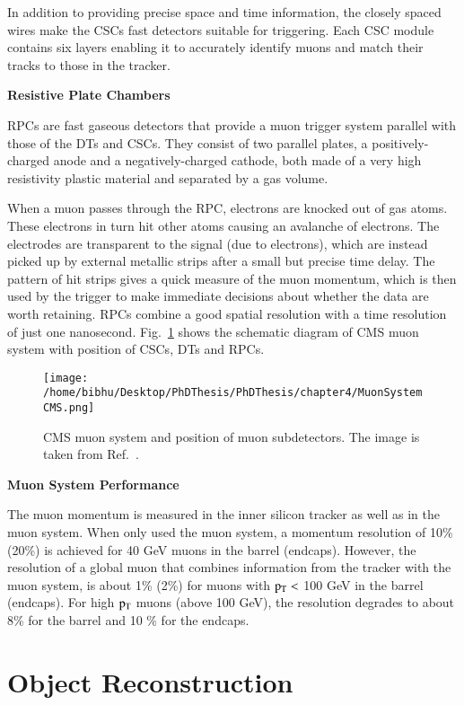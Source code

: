 In addition to providing precise space and time information, the closely spaced wires make the CSCs fast detectors suitable for triggering. Each CSC module contains six layers enabling it to accurately identify muons and match their tracks to those in the tracker. 


{\bf Resistive Plate Chambers}

RPCs are fast gaseous detectors that provide a muon trigger system parallel with those of the DTs and CSCs. They consist of two parallel plates, a positively-charged anode and a negatively-charged cathode, both made of a very high resistivity plastic material and separated by a gas volume.

When a muon passes through the RPC, electrons are knocked out of gas atoms. These electrons in turn hit other atoms causing an avalanche of electrons. The electrodes are transparent to the signal (due to electrons), which are instead picked up by external metallic strips after a small but precise time delay. The pattern of hit strips gives a quick measure of the muon momentum, which is then used by the trigger to make immediate decisions about whether the data are worth retaining. RPCs combine a good spatial resolution with a time resolution of just one nanosecond. Fig.~\ref{fig:MuonSystem} shows the schematic diagram of CMS muon system with position of CSCs, DTs and RPCs.


\begin{figure}[H]
    \centering
    \texttt{[image: /home/bibhu/Desktop/PhDThesis/PhDThesis/chapter4/MuonSystemCMS.png]}
    \caption{ \small CMS muon system and position of muon subdetectors. The image is taken from Ref.~\cite{MuonSysImage}.}
    \label{fig:MuonSystem}
\end{figure}

{\bf Muon System Performance}

The muon momentum is measured in the inner silicon tracker as well as in the muon system. When only used the muon system, a momentum resolution of 10\% (20\%) is achieved for 40 GeV muons in the barrel (endcaps). However, the resolution of a global muon that combines information from the tracker with the muon system, is about 1\% (2\%) for muons with $\rm p_{T} <$ 100 GeV in the barrel (endcaps). For high $\rm p_{T}$ muons (above 100 GeV), the resolution degrades to about 8\% for the barrel and 10 \% for the endcaps.





\section{Object Reconstruction}


